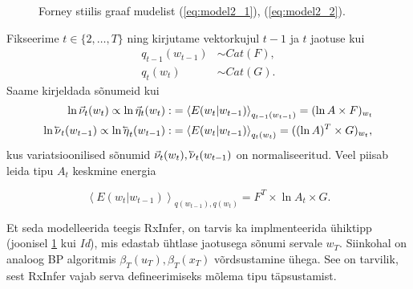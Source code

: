 \begin{figure}[!ht]
\centering
{}%
\caption{Forney stiilis graaf mudelist (\ref{eq:model2_1}), (\ref{eq:model2_2}).}
\label{fig:tmm_model2}
\end{figure}

Fikseerime $t \in \{2,\ldots,T\}$ ning kirjutame vektorkujul $t-1$ ja $t$ jaotuse kui
\begin{align*}
    q_{t-1}(w_{t-1}) &\sim Cat(F),\\
    q_{t}(w_{t}) &\sim Cat(G).
\end{align*}
Saame kirjeldada sõnumeid kui 
\begin{align*}
    \ln \vec{\nu}_{t}(w_t) \propto \ln \vec{\eta}_t(w_t) :&= \left< E(w_t | w_{t-1}) \right>_{q_{t-1}(w_{t-1})} = (\ln A \times F)_{w_t} \\
    \ln \cev{\nu}_{t}(w_{t-1}) \propto \ln \cev{\eta}_{t}(w_{t-1}) :&= \left< E(w_{t} | w_{t-1}) \right>_{q_{t}(w_{t})} = ((\ln A)^T \times G)_{w_{t}},
\end{align*}
kus variatsioonilised sõnumid $\vec{\nu}_{t}(w_t), \cev{\nu}_{t}(w_{t-1})$ on normaliseeritud. Veel piisab leida tipu $A_t$ keskmine energia

$$\left<E(w_t|w_{t-1}) \right>_{q(w_{t-1}),q(w_t) } = F^T \times \ln A_t \times G.$$

Et seda modelleerida teegis RxInfer, on tarvis ka implmenteerida ühiktipp (joonisel \ref{fig:tmm_model2} kui \emph{Id}), mis edastab ühtlase jaotusega sõnumi servale $w_T$. Siinkohal on analoog BP algoritmis $\beta_T(u_T), \beta_T(x_T)$ võrdsustamine ühega. See on tarvilik, sest RxInfer vajab serva defineerimiseks mõlema tipu täpsustamist.